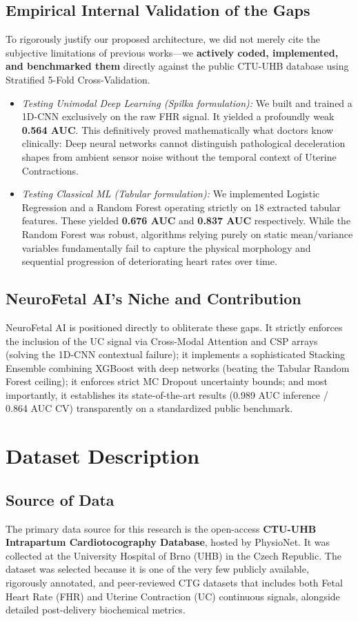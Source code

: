 \documentclass[12pt,a4paper]{report}
\begin{document}
\section{Empirical Internal Validation of the Gaps}
To rigorously justify our proposed architecture, we did not merely cite the subjective limitations of previous works---we \textbf{actively coded, implemented, and benchmarked them} directly against the public CTU-UHB database using Stratified 5-Fold Cross-Validation. 
\begin{itemize}
    \item \textit{Testing Unimodal Deep Learning (Spilka formulation):} We built and trained a 1D-CNN exclusively on the raw FHR signal. It yielded a profoundly weak \textbf{0.564 AUC}. This definitively proved mathematically what doctors know clinically: Deep neural networks cannot distinguish pathological deceleration shapes from ambient sensor noise without the temporal context of Uterine Contractions.
    \item \textit{Testing Classical ML (Tabular formulation):} We implemented Logistic Regression and a Random Forest operating strictly on 18 extracted tabular features. These yielded \textbf{0.676 AUC} and \textbf{0.837 AUC} respectively. While the Random Forest was robust, algorithms relying purely on static mean/variance variables fundamentally fail to capture the physical morphology and sequential progression of deteriorating heart rates over time.
\end{itemize}

\section{NeuroFetal AI's Niche and Contribution}
NeuroFetal AI is positioned directly to obliterate these gaps. It strictly enforces the inclusion of the UC signal via Cross-Modal Attention and CSP arrays (solving the 1D-CNN contextual failure); it implements a sophisticated Stacking Ensemble combining XGBoost with deep networks (beating the Tabular Random Forest ceiling); it enforces strict MC Dropout uncertainty bounds; and most importantly, it establishes its state-of-the-art results (0.989 AUC inference / 0.864 AUC CV) transparently on a standardized public benchmark.

\chapter{Dataset Description}
\section{Source of Data}
The primary data source for this research is the open-access \textbf{CTU-UHB Intrapartum Cardiotocography Database}, hosted by PhysioNet. It was collected at the University Hospital of Brno (UHB) in the Czech Republic. The dataset was selected because it is one of the very few publicly available, rigorously annotated, and peer-reviewed CTG datasets that includes both Fetal Heart Rate (FHR) and Uterine Contraction (UC) continuous signals, alongside detailed post-delivery biochemical metrics.
\end{document}
